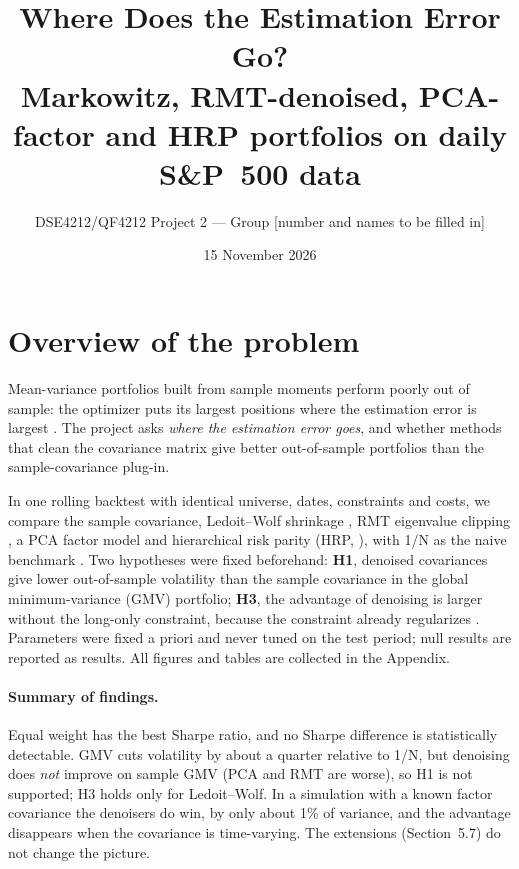 \documentclass[11pt,a4paper]{article}
\title{Where Does the Estimation Error Go?\\[0.2em]
\large Markowitz, RMT-denoised, PCA-factor and HRP portfolios on daily S\&P~500 data}
\author{DSE4212/QF4212 Project 2 --- Group [number and names to be filled in]}
\date{15 November 2026}
\begin{document}
\maketitle

\section{Overview of the problem}

Mean-variance portfolios built from sample moments perform poorly out of sample: the optimizer puts its
largest positions where the estimation error is largest \cite{michaud1989,markowitz1952}. The project
asks \emph{where the estimation error goes}, and whether methods that clean the covariance matrix give
better out-of-sample portfolios than the sample-covariance plug-in.

In one rolling backtest with identical universe, dates, constraints and costs, we compare the sample
covariance, Ledoit--Wolf shrinkage \cite{lw2004}, RMT eigenvalue clipping \cite{mp1967,laloux1999}, a PCA
factor model and hierarchical risk parity (HRP, \cite{lopezdeprado2016}), with 1/N as the naive benchmark
\cite{demiguel2009}. Two hypotheses were fixed beforehand: \textbf{H1}, denoised covariances give lower
out-of-sample volatility than the sample covariance in the global minimum-variance (GMV) portfolio;
\textbf{H3}, the advantage of denoising is larger without the long-only constraint, because the constraint
already regularizes \cite{jagannathanma2003}. Parameters were fixed a priori and never tuned on the test
period; null results are reported as results. All figures and tables are collected in the Appendix.

\paragraph{Summary of findings.} Equal weight has the best Sharpe ratio, and no Sharpe difference is
statistically detectable. GMV cuts volatility by about a quarter relative to 1/N, but denoising does
\emph{not} improve on sample GMV (PCA and RMT are worse), so H1 is not supported; H3 holds only for
Ledoit--Wolf. In a simulation with a known factor covariance the denoisers do win, by only about 1\% of
variance, and the advantage disappears when the covariance is time-varying. The extensions
(Section~5.7) do not change the picture.

\end{document}
